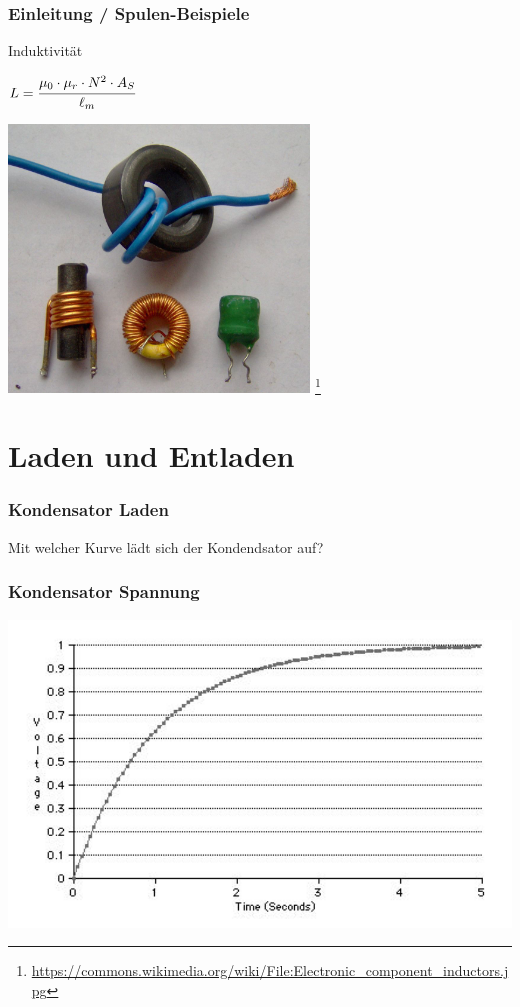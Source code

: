 \begin{frame}
  \frametitle{Einleitung / Spulen-Beispiele}
  \begin{block}{Induktivität}
    \begin{center}
      \Large{$L = \cfrac{\mu_0 \cdot \mu_r \cdot N^2 \cdot A_S}{\ell_m}$}
    \end{center}
  \end{block}
  \begin{center}
    \includegraphics[width=0.6\textwidth,height=0.5\textheight,keepaspectratio]{a03/Spule.jpg}
    \footnote{\tiny \url{https://commons.wikimedia.org/wiki/File:Electronic_component_inductors.jpg}}
  \end{center}
\end{frame}


\section*{Laden und Entladen}

\begin{frame}
    \frametitle{Kondensator Laden}
    \begin{center}
        \Large{Mit welcher Kurve lädt sich der Kondendsator auf?}\\        
    \end{center}
\end{frame}

\begin{frame}
    \frametitle{Kondensator Spannung}
	\begin{center}
        \includegraphics[width=1\textwidth,height=.85\textheight,keepaspectratio]{a03/Capacitor_Charge_Graph.jpg}
        \tiny \hyperlink{refs}{\cite{wc}}
    \end{center}
\end{frame}

